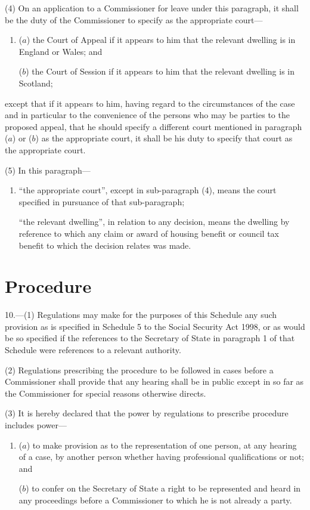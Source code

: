 \documentclass[12pt,a4paper]{article}
\begin{document}
(4) On an application to a Commissioner for leave under this paragraph, it shall be the duty of the Commissioner to specify as the appropriate court—
\begin{enumerate}\item[]
($a$) the Court of Appeal if it appears to him that the relevant dwelling is in England or Wales; and

($b$) the Court of Session if it appears to him that the relevant dwelling is in Scotland;
\end{enumerate}
except that if it appears to him, having regard to the circumstances of the case and in particular to the convenience of the persons who may be parties to the proposed appeal, that he should specify a different court mentioned in paragraph ($a$)  or ($b$)  as the appropriate court, it shall be his duty to specify that court as the appropriate court.

(5) In this paragraph—
\begin{enumerate}\item[]
    “the appropriate court”, except in sub-paragraph (4), means the court specified in pursuance of that sub-paragraph;

    “the relevant dwelling”, in relation to any decision, means the dwelling by reference to which any claim or award of housing benefit or council tax benefit to which the decision relates was made. 
\end{enumerate}

\section*{Procedure}

10.---(1) Regulations may make for the purposes of this Schedule any such provision as is specified in Schedule 5 to the Social Security Act 1998, or as would be so specified if the references to the Secretary of State in paragraph 1 of that Schedule were references to a relevant authority.

(2) Regulations prescribing the procedure to be followed in cases before a Commissioner shall provide that any hearing shall be in public except in so far as the Commissioner for special reasons otherwise directs.

(3) It is hereby declared that the power by regulations to prescribe procedure includes power—
\begin{enumerate}\item[]
($a$) to make provision as to the representation of one person, at any hearing of a case, by another person whether having professional qualifications or not; and

($b$) to confer on the Secretary of State a right to be represented and heard in any proceedings before a Commissioner to which he is not already a party.
\end{enumerate}
\end{document}

